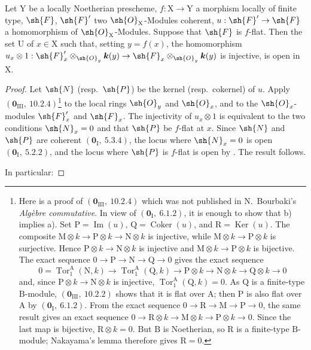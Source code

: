 \begin{corollary}[11.1.2]
\label{IV.11.1.2}
Let $\mathrm{Y}$ be a locally Noetherian prescheme, $f:\mathrm{X}\to\mathrm{Y}$ a morphism locally of finite type, $\sh{F}$, $\sh{F}'$ two $\sh{O}_\mathrm{X}$-Modules coherent, $u:\sh{F}'\to\sh{F}$ a homomorphism of $\sh{O}_\mathrm{X}$-Modules. Suppose that $\sh{F}$ is $f$-flat. Then the set $\mathrm{U}$ of $x\in\mathrm{X}$ such that, setting $y=f(x)$, the homomorphism $u_x\otimes 1:\sh{F}'_x\otimes_{\sh{O}_y}\boldsymbol{k}(y)\to\sh{F}_x\otimes_{\sh{O}_y}\boldsymbol{k}(y)$ is injective, is open in $\mathrm{X}$.
\end{corollary}

\begin{proof}
Let $\sh{N}$ (resp.\ $\sh{P}$) be the kernel (resp.\ cokernel) of $u$.
Apply $(\mathbf{0}_{\mathrm{III}},~10.2.4)$\footnote{Here is a proof of
$(\mathbf{0}_{\mathrm{III}},~10.2.4)$ which was not published in
N.~Bourbaki's \emph{Alg\`ebre commutative}. In view of
$(\mathbf{0}_\mathrm{I},~6.1.2)$, it is enough to show that b) implies a).
Set $\mathrm{P}=\operatorname{Im}(u)$,
$\mathrm{Q}=\operatorname{Coker}(u)$, and
$\mathrm{R}=\operatorname{Ker}(u)$. The composite
$\mathrm{M}\otimes k\to\mathrm{P}\otimes k\to\mathrm{N}\otimes k$ is
injective, while $\mathrm{M}\otimes k\to\mathrm{P}\otimes k$ is
surjective. Hence $\mathrm{P}\otimes k\to\mathrm{N}\otimes k$ is
injective and $\mathrm{M}\otimes k\to\mathrm{P}\otimes k$ is bijective.
The exact sequence $0\to\mathrm{P}\to\mathrm{N}\to\mathrm{Q}\to0$ gives
the exact sequence
\[
0=\operatorname{Tor}_1^\mathrm{A}(\mathrm{N},k)\to\operatorname{Tor}_1^\mathrm{A}(\mathrm{Q},k)\to\mathrm{P}\otimes k\to\mathrm{N}\otimes k\to\mathrm{Q}\otimes k\to 0
\]
and, since $\mathrm{P}\otimes k\to\mathrm{N}\otimes k$ is injective,
$\operatorname{Tor}_1^\mathrm{A}(\mathrm{Q},k)=0$. As $\mathrm{Q}$ is a
finite-type $\mathrm{B}$-module,
$(\mathbf{0}_{\mathrm{III}},~10.2.2)$ shows that it is flat over
$\mathrm{A}$; then $\mathrm{P}$ is also flat over $\mathrm{A}$ by
$(\mathbf{0}_\mathrm{I},~6.1.2)$. From the exact sequence
$0\to\mathrm{R}\to\mathrm{M}\to\mathrm{P}\to0$, the same result gives an
exact sequence
$0\to\mathrm{R}\otimes k\to\mathrm{M}\otimes k\to
\mathrm{P}\otimes k\to0$. Since the last map is bijective,
$\mathrm{R}\otimes k=0$. But $\mathrm{B}$ is Noetherian, so
$\mathrm{R}$ is a finite-type $\mathrm{B}$-module; Nakayama's lemma
therefore gives $\mathrm{R}=0$.}
to the local rings $\sh{O}_y$ and $\sh{O}_x$, and to the
$\sh{O}_x$-modules $\sh{F}'_x$ and $\sh{F}_x$. The injectivity of
$u_x\otimes1$ is equivalent to the two conditions
$\sh{N}_x=0$ and that $\sh{P}$ be $f$-flat at $x$. Since
$\sh{N}$ and $\sh{P}$ are coherent $(\mathbf{0}_\mathrm{I},~5.3.4)$,
the locus where $\sh{N}_x=0$ is open
$(\mathbf{0}_\mathrm{I},~5.2.2)$, and the locus where $\sh{P}$ is
$f$-flat is open by . The result follows.

In particular:
\end{proof}

